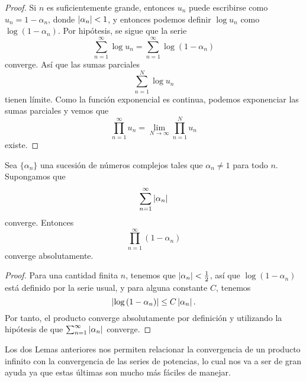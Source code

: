 \begin{proof}
    Si $n$ es suficientemente grande, entonces $u_n$ puede escribirse como $u_n = 1 - \alpha_n$, donde $\left\lvert\alpha_n\right\rvert < 1$, y entonces podemos definir $\log{u_n}$ como $\log{(1 - \alpha_n)}$. Por hipótesis, se sigue que la serie
    \begin{equation*}
        \sum_{n=1}^{\infty} \log u_n = \sum_{n=1}^{\infty} \log{(1 - \alpha_n)}
    \end{equation*}
    converge. Así que las sumas parciales
    \begin{equation*}
        \sum_{n=1}^{N} \log u_n
    \end{equation*}
    tienen límite. Como la función exponencial es continua, podemos exponenciar las sumas parciales y vemos que
    \begin{equation*}
        \prod_{n=1}^{\infty} u_n = \lim_{N \to \infty} \prod_{n=1}^{N} u_n
    \end{equation*}
    existe.
\end{proof}

\begin{lemma}
    \label{th:convergencia}
    Sea $\{\alpha_n\}$ una sucesión de números complejos tales que $\alpha_n \not = 1$ para todo $n$. Supongamos que
    \begin{equation*}
        \sum_{n=1}^{\infty} \left\lvert\alpha_n\right\rvert
    \end{equation*}
    converge. Entonces
    \begin{equation*}
        \prod_{n=1}^{\infty} (1 - \alpha_n)
    \end{equation*}
    converge absolutamente.
\end{lemma}

\begin{proof}
    Para una cantidad finita $n$, tenemos que $\left\lvert\alpha_n\right\rvert < \frac{1}{2}$, así que $\log{(1 - \alpha_n)}$ está definido por la serie usual, y para alguna constante $C$, tenemos
    \begin{equation*}
        \left\lvert\log{(1 - \alpha_n)}\right\rvert \leq C \left\lvert\alpha_n\right\rvert.
    \end{equation*}
    Por tanto, el producto converge absolutamente por definición y utilizando la hipótesis de que $\sum_{n=1}^{\infty} \left\lvert\alpha_n\right\rvert$ converge.
\end{proof}

Los dos Lemas anteriores nos permiten relacionar la convergencia de un producto infinito con la convergencia de las series de potencias, lo cual nos va a ser de gran ayuda ya que estas últimas son mucho más fáciles de manejar. \\

